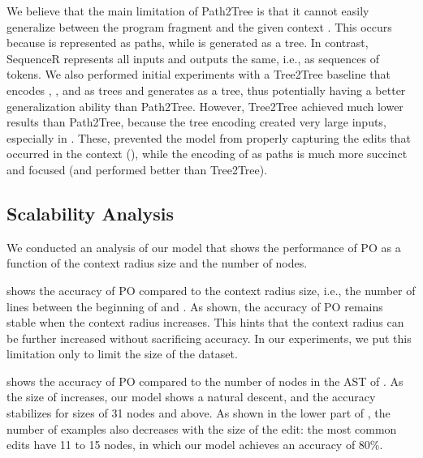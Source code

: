 We believe that the main limitation of Path2Tree is that it cannot easily generalize between the program fragment  and the given context . This occurs because  is represented as paths, while  is generated as a tree. In contrast, SequenceR represents all inputs and outputs the same, i.e., as sequences of tokens. We also performed initial experiments with a Tree2Tree baseline that encodes , , and  as trees and generates  as a tree, thus potentially having a better generalization ability than Path2Tree. However, Tree2Tree achieved much lower results than Path2Tree, because the tree encoding created very large inputs, especially in . These, prevented the model from properly capturing the edits that occurred in the context (), while the encoding of  as paths is much more succinct and focused (and performed better than Tree2Tree).


\subsection{Scalability Analysis}
We conducted an analysis of our model that shows the performance of \ctc{}PO as a function of the context radius size and the number of nodes.

 shows the accuracy of \ctc{}PO compared to the context radius size, i.e., the number of lines between the beginning of  and .
As shown, the accuracy of \ctc{}PO remains stable when the context radius increases. This hints that the context radius can be further increased without sacrificing accuracy. In our experiments, we put this limitation only to limit the size of the dataset.



 shows the accuracy of \ctc{}PO compared to the number of nodes in the AST of . As the size of  increases, our model shows a natural descent, and the accuracy stabilizes for sizes of 31 nodes and above. As shown in the lower part of , the number of examples also decreases with the size of the edit: the most common edits have 11 to 15 nodes, in which our model achieves an accuracy of 80\%.













